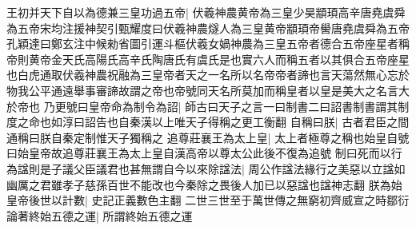 王初并天下自以為德兼三皇功過五帝|{
	伏羲神農黄帝為三皇少昊顓頊高辛唐堯虞舜為五帝宋均注援神契引甄耀度曰伏羲神農燧人為三皇黄帝顓頊帝嚳唐堯虞舜為五帝　孔穎達曰鄭玄注中候勑省圖引運斗樞伏羲女媧神農為三皇五帝者德合五帝座星者稱帝則黄帝金天氏高陽氏高辛氏陶唐氏有虞氏是也實六人而稱五者以其俱合五帝座星也白虎通取伏羲神農祝融為三皇帝者天之一名所以名帝帝者諦也言天蕩然無心忘於物我公平通遠舉事審諦故謂之帝也帝號同天名所莫加而稱皇者以皇是美大之名言大於帝也}
乃更號曰皇帝命為制令為詔|{
	師古曰天子之言一曰制書二曰詔書制書謂其制度之命也如淳曰詔告也自秦漢以上唯天子得稱之更工衡翻}
自稱曰朕|{
	古者君臣之間通稱曰朕自秦定制惟天子獨稱之}
追尊莊襄王為太上皇|{
	太上者極尊之稱也始皇自號曰始皇帝故追尊莊襄王為太上皇自漢高帝以尊太公此後不復為追號}
制曰死而以行為諡則是子議父臣議君也甚無謂自今以來除諡法|{
	周公作諡法緣行之美惡以立諡如幽厲之君雖孝子慈孫百世不能改也今秦除之畏後人加已以惡諡也諡神志翻}
朕為始皇帝後世以計數|{
	史記正義數色主翻}
二世三世至于萬世傳之無窮初齊威宣之時鄒衍論著終始五德之運|{
	所謂終始五德之運}


